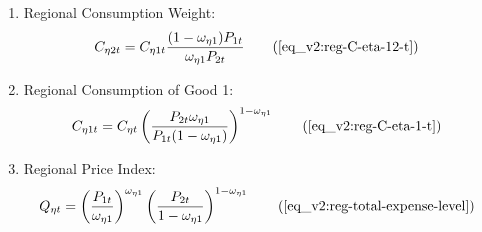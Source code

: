 \documentclass[../thesis.tex]{subfiles}
\begin{document}
{\begin{itemize}
\begin{enumerate}
		\item Regional Consumption Weight:
		\begin{align}
			C_{\eta 2 t} &= C_{\eta 1 t} \frac{(1 - \omega_{\eta 1}) P_{1t}}{\omega_{\eta 1} P_{2t}} \tag{\ref{eq_v2:reg-C-eta-12-t}}
		\end{align}
		
		\item Regional Consumption of Good 1:	
		\begin{align}
			C_{\eta 1 t} &= C_{\eta t} \left( \frac{P_{2t} \omega_{\eta 1}}{P_{1t} (1 - \omega_{\eta 1})} \right)^{1-\omega_{\eta 1}} \tag{\ref{eq_v2:reg-C-eta-1-t}}
		\end{align}
		
		\item Regional Price Index:
		\begin{align}
			Q_{\eta t} &= \left( \frac{P_{1 t}}{\omega_{\eta 1}} \right)^{\omega_{\eta 1}} \left( \frac{P_{2 t}}{1 -\omega_{\eta 1}} \right)^{1 -\omega_{\eta  1}} \tag{\ref{eq_v2:reg-total-expense-level}}
		\end{align}
		
		\begin{comment}
			\item Regional Terms of Trade:
			\begin{align}
				\frac{Q_{1t}}{Q_{2t}} &= \frac{\omega_{21}^{\omega_{21}} (1 -\omega_{21})^{1 -\omega_{21}}}{\omega_{11}^{\omega_{11}} (1 - \omega_{11})^{1 - \omega_{11}}} \tag{\ref{eq_v2:reg-total-expense-level-2}}
			\end{align}

	\begin{align}
		C_{\eta t} &= C_{\eta 1 t}^{\omega_{\eta 1}} C_{\eta 2 t}^{1-\omega_{\eta 1}} \tag{\ref{eq_v2:reg-consumption-aggregation}}
	\end{align}

	\begin{align}
		C_{11t} &= C_{12t} \frac{\omega_{11} P_{2t}}{(1 - \omega_{11}) P_{1t}} \tag{\ref{eq_v2:reg-C-eta-12-t}}
	\end{align}

	\item Regional Consumption Weights:
		\begin{align}
			\frac{C_{11t} C_{22t}}{C_{21t} C_{12t}} &= \frac{\omega_{11} (1 - \omega_{21})}{\omega_{21} (1 - \omega_{11})} \tag{\ref{eq_v2:reg-C-12-12-t}}
		\end{align}

		\begin{align}
			Q_{1t} &= \left( \frac{P_{1 t}}{\omega_{11}} \right)^{\omega_{11}} \left( \frac{P_{2 t}}{1 -\omega_{11}} \right)^{1 -\omega_{11}} \tag{\ref{eq_v2:reg-total-expense-level}}
		\end{align}


\end{comment}
\end{enumerate}
\end{itemize}}
\end{document}

